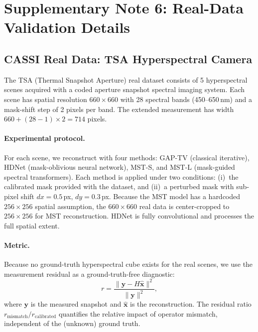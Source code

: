 \documentclass[11pt]{article}
\theoremstyle{definition}
\begin{document}
\newpage

\section{Supplementary Note 6: Real-Data Validation Details}
\label{sec:realdata}

\subsection{CASSI Real Data: TSA Hyperspectral Camera}

The TSA (Thermal Snapshot Aperture) real dataset consists of 5 hyperspectral
scenes acquired with a coded aperture snapshot spectral imaging system.
Each scene has spatial resolution $660 \times 660$ with 28 spectral bands
(450--650\,nm) and a mask-shift step of 2 pixels per band.  The extended
measurement has width $660 + (28-1) \times 2 = 714$ pixels.

\paragraph{Experimental protocol.}
For each scene, we reconstruct with four methods: GAP-TV (classical
iterative), HDNet (mask-oblivious neural network), MST-S, and MST-L
(mask-guided spectral transformers).  Each method is applied under two
conditions: (i)~the calibrated mask provided with the dataset, and
(ii)~a perturbed mask with sub-pixel shift $dx = 0.5$\,px, $dy = 0.3$\,px.
Because the MST model has a hardcoded $256 \times 256$ spatial assumption,
the $660 \times 660$ real data is center-cropped to $256 \times 256$ for
MST reconstruction.  HDNet is fully convolutional and processes the full
spatial extent.

\paragraph{Metric.}
Because no ground-truth hyperspectral cube exists for the real scenes,
we use the measurement residual as a ground-truth-free diagnostic:
\begin{equation}
  r = \frac{\|\mathbf{y} - H\hat{\mathbf{x}}\|^2}{\|\mathbf{y}\|^2},
  \label{eq:meas_residual}
\end{equation}
where $\mathbf{y}$ is the measured snapshot and $\hat{\mathbf{x}}$ is the
reconstruction.  The residual ratio $r_{\mathrm{mismatch}} /
r_{\mathrm{calibrated}}$ quantifies the relative impact of operator
mismatch, independent of the (unknown) ground truth.
\end{document}

